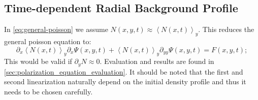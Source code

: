 \documentclass[master.tex]{subfiles}
\begin{document}
\subsection{Time-dependent Radial Background Profile}
In \autoref{eq:general-poisson} we assume $N(x,y,t) \approx \left<N(x,t)\right>_y$. This reduces the general poisson equation to:
\begin{equation}
    \partial_x \left<N(x,t)\right>_y \partial_x \Psi(x,y,t) + \left<N(x,t)\right>_y \partial_{yy} \Psi(x,y,t) = F(x,y,t);
\end{equation}
This would be valid if $\partial_y N \approx 0$.
\newline
Evaluation and results are found in \autoref{sec:polarization_equation_evaluation}. It should be noted that the first and second linearization naturally depend on the initial density profile and thus it needs to be chosen carefully.
\end{document}
